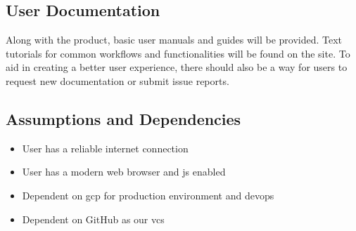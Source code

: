     \subsection{User Documentation}\label{sec:user-documentation}
        Along with the product, basic user manuals and guides will be provided. Text tutorials for common workflows and functionalities will be found on the site. To aid in creating a better user experience, there should also be a way for users to request new documentation or submit issue reports.
    \subsection{Assumptions and Dependencies}\label{sec:assumptions-dependencies}
        \begin{itemize}
            \item User has a reliable internet connection
            \item User has a modern web browser and \acrlong{js} enabled
            \item Dependent on \gls{gcp} for production environment and \gls{devops}
            \item Dependent on GitHub as our \gls{vcs}
        \end{itemize}
